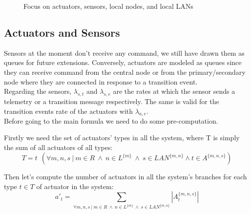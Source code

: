 \documentclass[11pt]{article}
\begin{document}
\begin{figure}[H]
	\centering
	\frame{}
	\caption{Focus on actuators, sensors,  local nodes, and local LANs}
\end{figure}

\subsection{Actuators and Sensors}
Sensors at the moment don't receive any command, we still have drawn them as queues for future extensions. Conversely, actuators are modeled as queues since they can receive command from the central node or from the primary/secondary node where they are connected in response to a transition event.\\
Regarding the sensors, $\lambda_{s,t}$ and $\lambda_{s,e}$ are the rates at which the sensor sends a telemetry or a transition message respectively. The same is valid for the transition events rate of the actuators with $\lambda_{a,e}$.\\

Before going to the main formula we need to do some pre-computation.


Firstly we need the set of actuators' types in all the system, where T is simply the sum of all actuators of all types:
\begin{equation}
    T = t \  \ (\forall m,n,s \ | \ m \in R \ \land \ n \in L^{\{m\}} \ \land \ s \in LAN^{\{m, n\}} \land t \in A^{\{m,n,s\}})
\end{equation}

Then let's compute the number of actuators in all the system's branches for each type $t \in T$ of actuator in the system:
\begin{equation}
    a'_{t} = \sum_{\forall m,n,s \ | \ m \in R \ \land \ n \in L^{\{m\}} \ \land \ s \in LAN^{\{m, n\}}}{ |A^{\{m, n, s\}}_{t}| }
\end{equation}
\end{document}
